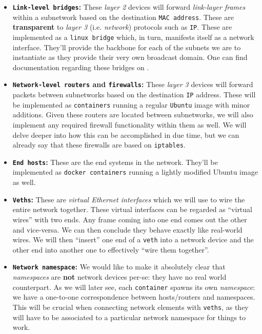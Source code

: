             \begin{itemize}
                \item \textbf{\texttt{Link-level bridges}:} These \textit{layer 2} devices will forward \textit{link-layer frames} within a subnetwork based on the destination \texttt{MAC address}. These are \textbf{transparent} to \textit{layer 3} (i.e. \textit{network}) protocols such as \texttt{IP}. These are implemented as a \texttt{linux bridge} which, in turn, manifests itself as a network interface. They'll provide the backbone for each of the subnets we are to instantiate as they provide their very own broadcast domain. One can find documentation regarding these bridges on \cite{bib:kernel-brds}.

                \item \textbf{\texttt{Network-level routers} and \texttt{firewalls}:} These \textit{layer 3} devices will forward packets between subnetworks based on the destination \texttt{IP} address. These will be implemented as \texttt{containers} running a regular \texttt{Ubuntu} image with minor additions. Given these routers are located between subnetworks, we will also implement any required firewall functionality within them as well. We will delve deeper into how this can be accomplished in due time, but we can already say that these firewalls are based on \texttt{iptables}.

                \item \textbf{\texttt{End hosts}:} These are the end systems in the network. They'll be implemented as \texttt{docker containers} running a lightly modified Ubuntu image as well.

                \item \textbf{\texttt{Veths}:} These are \textit{virtual Ethernet interfaces} which we will use to wire the entire network together. These virtual interfaces can be regarded as ``virtual wires'' with two ends. Any frame coming into one end comes out the other and vice-versa. We can then conclude they behave exactly like real-world wires. We will then ``insert'' one end of a \texttt{veth} into a network device and the other end into another one to effectively ``wire them together''.

                \item \textbf{\texttt{Network namespace}:} We would like to make it absolutely clear that \textit{namespaces} are \textbf{not} network devices per-se: they have no real world counterpart. As we will later see, each \texttt{container} spawns its own \textit{namespace}: we have a one-to-one correspondence between hosts/routers and namespaces. This will be crucial when connecting network elements with \texttt{veths}, as they will have to be associated to a particular network namespace for things to work.
            \end{itemize}

